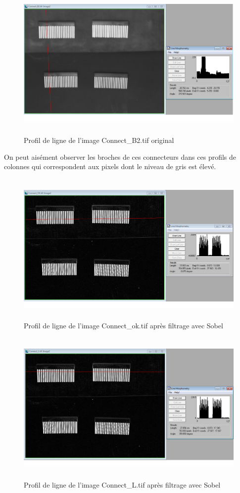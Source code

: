 \documentclass{scrreprt}
\begin{document}
\newpage
\begin{figure}[!h]
\centering
\includegraphics[height=7.5cm,width=15cm]{images/connectB2line.png}
\caption{Profil de ligne de l'image Connect_B2.tif original}
\end{figure}

On peut aisément observer les broches de ces connecteurs dans ces profils de colonnes qui correspondent aux pixels dont le niveau de gris est élevé. 

\begin{figure}[!h]
\centering
\includegraphics[height=7.5cm,width=15cm]{images/connectoklineSobel.png}
\caption{Profil de ligne de l'image Connect_ok.tif après filtrage avec Sobel}
\end{figure}

\newpage
\begin{figure}[!h]
\centering
\includegraphics[height=7.5cm,width=15cm]{images/connectLlineSobel.png}
\caption{Profil de ligne de l'image Connect_L.tif après filtrage avec Sobel}
\end{figure}
\end{document}
